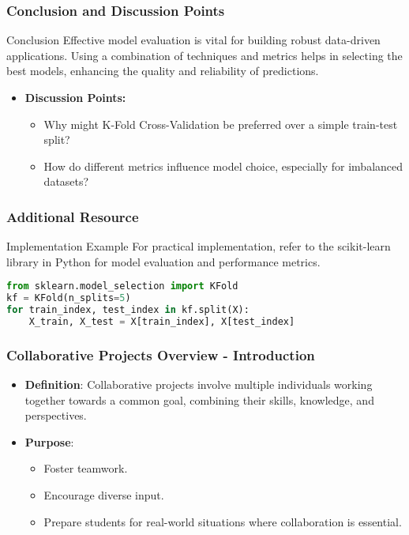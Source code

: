 \documentclass[aspectratio=169]{beamer}
\begin{document}
\begin{frame}[fragile]
    \frametitle{Conclusion and Discussion Points}
    \begin{block}{Conclusion}
        Effective model evaluation is vital for building robust data-driven applications. Using a combination of techniques and metrics helps in selecting the best models, enhancing the quality and reliability of predictions.
    \end{block}
    
    \begin{itemize}
        \item \textbf{Discussion Points:}
            \begin{itemize}
                \item Why might K-Fold Cross-Validation be preferred over a simple train-test split?
                \item How do different metrics influence model choice, especially for imbalanced datasets?
            \end{itemize}
    \end{itemize}
\end{frame}

\begin{frame}[fragile]
    \frametitle{Additional Resource}
    \begin{block}{Implementation Example}
        For practical implementation, refer to the scikit-learn library in Python for model evaluation and performance metrics.
        \begin{lstlisting}[language=Python]
from sklearn.model_selection import KFold
kf = KFold(n_splits=5)
for train_index, test_index in kf.split(X):
    X_train, X_test = X[train_index], X[test_index]
        \end{lstlisting}
    \end{block}
\end{frame}

\begin{frame}[fragile]
    \frametitle{Collaborative Projects Overview - Introduction}
    \begin{itemize}
        \item \textbf{Definition}: Collaborative projects involve multiple individuals working together towards a common goal, combining their skills, knowledge, and perspectives.
        \item \textbf{Purpose}:
        \begin{itemize}
            \item Foster teamwork.
            \item Encourage diverse input.
            \item Prepare students for real-world situations where collaboration is essential.
        \end{itemize}
    \end{itemize}
\end{frame}
\end{document}
